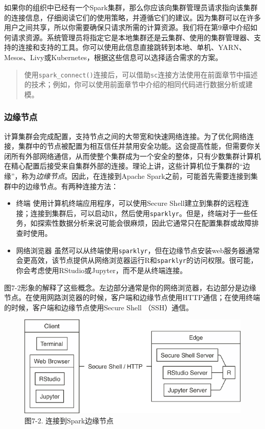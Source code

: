 \documentclass[
]{article}
\providecommand{\tightlist}{%
  \setlength{\itemsep}{0pt}\setlength{\parskip}{0pt}}
\begin{document}
如果你的组织中已经有一个Spark集群，那么你应该向集群管理员请求指向该集群的连接信息，仔细阅读它们的使用策略，并遵循它们的建议。因为集群可以在许多用户之间共享，所以你需要确保只请求所需的计算资源。我们将在第9章中介绍如何请求资源。系统管理员将指定它是本地集群还是云集群、使用的集群管理器、支持的连接和支持的工具。你可以使用此信息直接跳转到本地、单机、YARN、Mesos、Livy或Kubernetes，根据这些信息可以选择适合需求的方案。

\begin{quote}
使用\texttt{spark\_connect()}连接后，可以借助\texttt{sc}连接方法使用在前面章节中描述的技术；例如，你可以使用前面章节中介绍的相同代码进行数据分析或建模。
\end{quote}

\hypertarget{ux8fb9ux7f18ux8282ux70b9}{%
\subsubsection{边缘节点}\label{ux8fb9ux7f18ux8282ux70b9}}

计算集群会完成配置，支持节点之间的大带宽和快速网络连接。为了优化网络连接，集群中的节点被配置为相互信任并禁用安全功能。这会提高性能，但需要你关闭所有外部网络通信，从而使整个集群成为一个安全的整体，只有少数集群计算机在精心配置后接受来自集群外部的连接。理论上讲，这些计算机位于集群的``边缘''，称为\emph{边缘节点}。因此，在连接到Apache
Spark之前，可能首先需要连接到集群中的边缘节点。有两种连接方法：

\begin{itemize}
\tightlist
\item
  终端 使用计算机终端应用程序，可以使用Secure
  Shell建立到集群的远程连接；连接到集群后，可以启动R，然后使用\texttt{sparklyr}。但是，终端对于一些任务，如探索性数据分析来说可能会很麻烦，因此它通常只在配置集群或故障排查时使用。
\item
  网络浏览器
  虽然可以从终端使用\texttt{sparklyr}，但在边缘节点安装web服务器通常会更高效，该节点提供从网络浏览器运行R和\texttt{sparklyr}的访问权限。很可能，你会考虑使用RStudio或Jupyter，而不是从终端连接。
\end{itemize}

图7-2形象的解释了这些概念。左边部分通常是你的网络浏览器，右边部分是边缘节点。在使用网路浏览器的时候，客户端和边缘节点使用HTTP通信；在使用终端的时候，客户端和边缘节点使用Secure
Shell （SSH）通信。

\begin{figure}
\centering
\includegraphics{figures/7_2.png}
\caption{图7-2. 连接到Spark边缘节点}
\end{figure}
\end{document}
